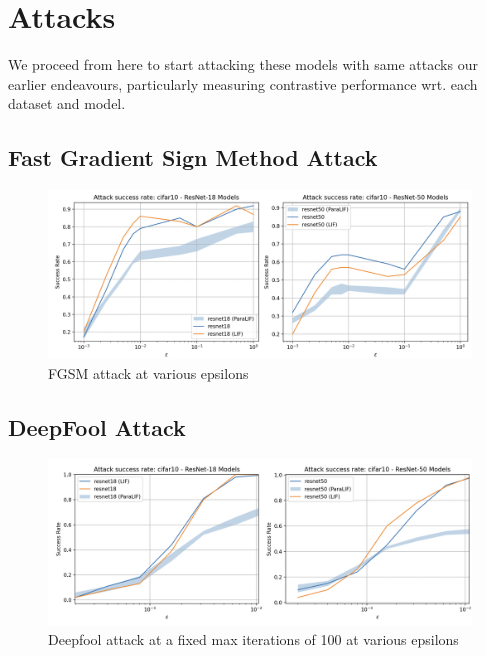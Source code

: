 \documentclass[conference]{IEEEtran}
\begin{document}
\section{Attacks}
We proceed from here to start attacking these models with same attacks our earlier endeavours, particularly measuring contrastive performance wrt. each dataset and model.

\subsection*{Fast Gradient Sign Method Attack}

\begin{figure}[h!]
    \centering
    \includegraphics[width=\linewidth]{resnet-fgsm-cifar10.png}
    \caption{FGSM attack at various epsilons}
    \label{fig:resnet_fgsm_attack}
\end{figure}

\subsection*{DeepFool Attack}

\begin{figure}[h!]
    \centering
    \includegraphics[width=\linewidth]{resnet-deepfool-cifar10.png}
    \caption{Deepfool attack at a fixed max iterations of 100 at various epsilons}
    \label{fig:resnet_deepfool_attack}
\end{figure}

\pagebreak
\end{document}
